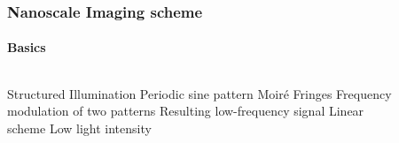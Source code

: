 \documentclass[mathserif,18pt,xcolor=table,c]{beamer}
\begin{document}
\begin{frame}[t]
  \frametitle{Nanoscale Imaging scheme}
  \framesubtitle{Basics}
  \begin{columns}[T] %
    \begin{column}{.4\textwidth}
      \begin{outline}[itemize]
        \1 Structured Illumination
        \2 Periodic sine pattern
        \1 Moiré Fringes
        \2 Frequency modulation of two patterns
        \2 Resulting low-frequency signal
        \1 Linear scheme
        \2 Low light intensity
      \end{outline}
    \end{column}
    \begin{column}[T]{.6\textwidth}
      \begin{center}
        \begin{figure}[t!]
          \vspace*{-2cm}
          \centering
          \subfloat{\scalebox{.07}{}
          \label{fig:test}} \hfil
          \subfloat{\scalebox{.07}{}
          \label{fig:sim_hi}}
        \end{figure}
        \begin{figure}
          \vspace*{-.5cm}
          \centering
          \def\svgwidth{.6\linewidth}
          
        \end{figure}
      \end{center}
      \end{column}%
    \end{columns}
  \end{frame}
\end{document}
